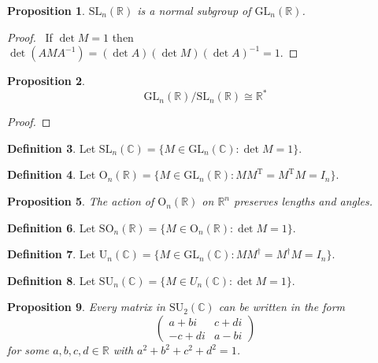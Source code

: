 \documentclass{book}
\let\qed\relax
\newtheorem{prop}{Proposition}[chapter]
\theoremstyle{definition}
\newtheorem{df}[prop]{Definition}
\begin{document}
\begin{prop}
$\mathrm{SL}_n(\mathbb{R})$ is a normal subgroup of $\mathrm{GL}_n(\mathbb{R})$.
\end{prop}

\begin{proof}
\pf\ If $\det M = 1$ then $\det(AMA^{-1}) = (\det A) (\det M) (\det A)^{-1} = 1$. \qed
\end{proof}

\begin{prop}
\[ \mathrm{GL}_n(\mathbb{R}) / \mathrm{SL}_n(\mathbb{R}) \cong \mathbb{R}^* \]
\end{prop}

\begin{proof}
\end{proof}

\begin{df}
Let $\mathrm{SL}_n(\mathbb{C}) = \{ M \in \mathrm{GL}_n(\mathbb{C}) : \det M = 1 \}$.
\end{df}

\begin{df}
Let $\mathrm{O}_n(\mathbb{R}) = \{ M \in \mathrm{GL}_n(\mathbb{R}) : M M^\mathrm{T} = M^\mathrm{T} M = I_n \}$.
\end{df}

\begin{prop}
The action of $\mathrm{O}_n(\mathbb{R})$ on $\mathbb{R}^n$ preserves lengths and angles.
\end{prop}


\begin{df}
Let $\mathrm{SO}_n(\mathbb{R}) = \{ M \in \mathrm{O}_n(\mathbb{R}) : \det M = 1 \}$.
\end{df}

\begin{df}
Let $\mathrm{U}_n(\mathbb{C}) = \{ M \in \mathrm{GL}_n(\mathbb{C}) : M M^\dagger = M^\dagger M = I_n \}$.
\end{df}

\begin{df}
Let $\mathrm{SU}_n(\mathbb{C}) = \{ M \in U_n(\mathbb{C}) : \det M = 1 \}$.
\end{df}

\begin{prop}
Every matrix in $\mathrm{SU}_2(\mathbb{C})$ can be written in the form
\[ \left( \begin{array}{cc}
a + b i & c + d i \\
-c + di & a - bi
\end{array} \right) \]
for some $a,b,c,d \in \mathbb{R}$ with $a^2 + b^2 + c^2 + d^2 = 1$.
\end{prop}
\end{document}
